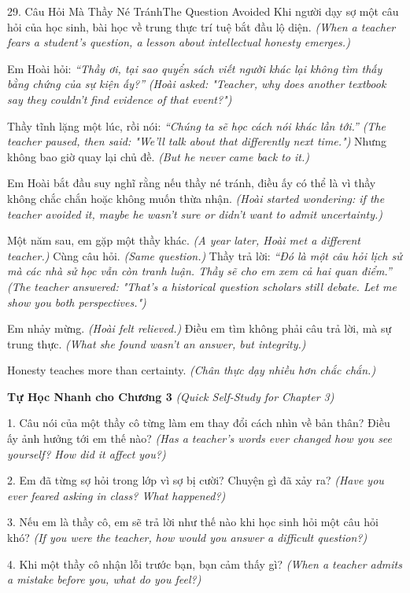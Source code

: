 \begin{truyen}{29. Câu Hỏi Mà Thầy Né Tránh}{The Question Avoided}
Khi người dạy sợ một câu hỏi của học sinh, bài học về trung thực trí tuệ bắt đầu lộ diện.
\textit{(When a teacher fears a student's question, a lesson about intellectual honesty emerges.)}

Em Hoài hỏi: \textit{``Thầy ơi, tại sao quyển sách viết người khác lại không tìm thấy bằng chứng của sự kiện ấy?''}
\textit{(Hoài asked: "Teacher, why does another textbook say they couldn't find evidence of that event?")}

Thầy tĩnh lặng một lúc, rồi nói: \textit{``Chúng ta sẽ học cách nói khác lần tới.''}
\textit{(The teacher paused, then said: "We'll talk about that differently next time.")}
Nhưng không bao giờ quay lại chủ đề.
\textit{(But he never came back to it.)}

Em Hoài bắt đầu suy nghĩ rằng nếu thầy né tránh, điều ấy có thể là vì thầy không chắc chắn hoặc không muốn thừa nhận.
\textit{(Hoài started wondering: if the teacher avoided it, maybe he wasn't sure or didn't want to admit uncertainty.)}

Một năm sau, em gặp một thầy khác.
\textit{(A year later, Hoài met a different teacher.)}
Cùng câu hỏi.
\textit{(Same question.)}
Thầy trả lời: \textit{``Đó là một câu hỏi lịch sử mà các nhà sử học vẫn còn tranh luận. Thầy sẽ cho em xem cả hai quan điểm.''}
\textit{(The teacher answered: "That's a historical question scholars still debate. Let me show you both perspectives.")}

Em nhảy mừng.
\textit{(Hoài felt relieved.)}
Điều em tìm không phải câu trả lời, mà sự trung thực.
\textit{(What she found wasn't an answer, but integrity.)}
\end{truyen}

\begin{baihoc}
Honesty teaches more than certainty.
\textit{(Chân thực dạy nhiều hơn chắc chắn.)}
\end{baihoc}

\begin{tuhocnhanh}
\textbf{Tự Học Nhanh cho Chương 3}
\textit{(Quick Self-Study for Chapter 3)}

1. Câu nói của một thầy cô từng làm em thay đổi cách nhìn về bản thân? Điều ấy ảnh hưởng tới em thế nào?
\textit{(Has a teacher's words ever changed how you see yourself? How did it affect you?)}

2. Em đã từng sợ hỏi trong lớp vì sợ bị cười? Chuyện gì đã xảy ra?
\textit{(Have you ever feared asking in class? What happened?)}

3. Nếu em là thầy cô, em sẽ trả lời như thế nào khi học sinh hỏi một câu hỏi khó?
\textit{(If you were the teacher, how would you answer a difficult question?)}

4. Khi một thầy cô nhận lỗi trước bạn, bạn cảm thấy gì?
\textit{(When a teacher admits a mistake before you, what do you feel?)}
\end{tuhocnhanh}

